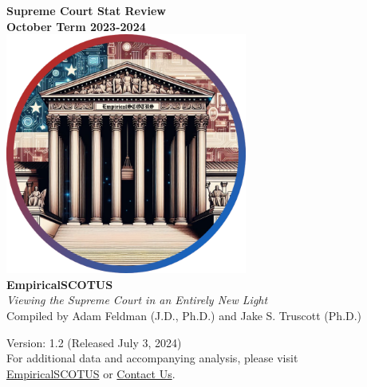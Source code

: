 

\usepackage{Sweave}




\thispagestyle{empty}
\begin{center}
  \Huge \textbf{Supreme Court Stat Review} \\
  \LARGE \textbf{October Term 2023-2024} \\[7mm]
  \includegraphics[width=300px]{Figures/intro_page_images/empirical_scotus_logo.png}\\[2mm]
  \textbf{EmpiricalSCOTUS} \\
  \textit{Viewing the Supreme Court in an Entirely New Light} \\[3mm]

  \normalsize
  Compiled by Adam Feldman (J.D., Ph.D.) and Jake S. Truscott (Ph.D.) \\
  \vfill

  \footnotesize
  Version: 1.2 (Released July 3, 2024) \\[2mm]

  \normalsize
 For additional data and accompanying analysis, please visit\\ \textcolor{blue}{\href{https://empiricalscotus.com/}{EmpiricalSCOTUS}} or \textcolor{blue}{\href{mailto:adam@feldmannet.com}{Contact Us}}.

\end{center}
\newpage




